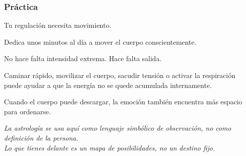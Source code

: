 \documentclass[11pt,a4paper]{article}
\begin{document}
\subsubsection*{Práctica}

Tu regulación necesita movimiento.

Dedica unos minutos al día a mover el cuerpo conscientemente.

No hace falta intensidad extrema. Hace falta salida.

Caminar rápido, movilizar el cuerpo, sacudir tensión o activar la respiración puede ayudar a que la energía no se quede acumulada internamente.

Cuando el cuerpo puede descargar, la emoción también encuentra más espacio para ordenarse.

\vspace{0.6cm}

\begin{center}
{\small\itshape\color{grisai}
La astrología se usa aquí como lenguaje simbólico de observación, no como definición de la persona.\\
Lo que tienes delante es un mapa de posibilidades, no un destino fijo.
}
\end{center}
\end{document}

